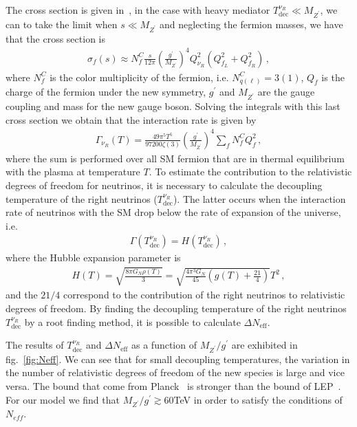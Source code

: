 \documentclass[12pt]{article}
\begin{document}
The cross section is given in~\cite{Barger:2003zh}, in the case with heavy mediator $T^{\nu_R}_{\text{dec}} \ll M_{Z^{\prime}}$, we can to take the limit when $s \ll M_{Z^{\prime}}$ and neglecting the fermion masses, we have that the cross section is
%
\begin{align*}
    \sigma_{f}(s) \approx N^{C}_{f} \frac{s}{12 \pi} \left( \frac{g^{\prime}}{M_{Z^{\prime}}} \right)^{4} Q^{2}_{\nu_R} (Q^{2}_{f_L} + Q^{2}_{f_R})\,,
\end{align*}
%
where $N^{C}_{f}$ is the color multiplicity of the fermion, i.e. $N^{C}_{q(\ell)} = 3(1)$, $Q_{f}$ is the charge of the fermion under the new symmetry, $g^{\prime}$ and $M_{Z^{\prime}}$ are the gauge coupling and mass for the new gauge boson. Solving the integrals with this last cross section we obtain that the interaction rate is given by
%
\begin{align*}
    \Gamma_{\nu_{R}}(T) = \frac{49 \pi^{5} T^{5}}{97200 \zeta(3)} \left( \frac{g^{\prime}}{M_{Z^{\prime}}} \right)^{4} \sum_{f} N^{C}_{f} Q^{2}_{f}\,,
\end{align*}
%
where the sum is performed over all SM fermion that are in thermal equilibrium with the plasma at temperature $T$. To estimate the contribution to the relativistic degrees of freedom for neutrinos, it is necessary to calculate the decoupling temperature of the right neutrinos ($T^{\nu_R}_{\text{dec}}$). The latter occurs when the interaction rate of neutrinos with the SM drop below the rate of expansion of the universe, i.e.
%
\begin{align*}
\Gamma(T^{\nu_R}_{\text{dec}}) = H(T^{\nu_R}_{\text{dec}})\,, 
\end{align*}
%
where the Hubble expansion parameter is
%
\begin{align*}
    H(T) = \sqrt{\frac{8 \pi G_{N} \rho(T)}{3}} = \sqrt{\frac{4 \pi^{3} G_{N}}{45} \left( g(T) + \frac{21}{4} \right)} T^{2}\,,
\end{align*}
%
and the $21/4$ correspond to the contribution of the right neutrinos to relativistic degrees of freedom. By finding the decoupling temperature of the right neutrinos $T^{\nu_R}_{\text{dec}} $ by a root finding method, it is possible to calculate $\Delta N_{\text{eff}}$.

The results of $T^{\nu_R}_{\text{dec}}$ and $\Delta N_{\text{eff}}$ as a function of $M_{Z^{\prime}}/g^{\prime}$ are exhibited in fig.~\ref{fig:Neff}. We can see that for small decoupling temperatures, the variation in the number of relativistic degrees of freedom of the new species is large and vice versa. The bound that come from Planck~\cite{ghanim:2018eyx} is stronger than the bound of LEP~\cite{Alioli:2017nzr}. For our model we find that $M_{Z^{\prime}}/g^{\prime} \gtrsim 60$TeV in order to satisfy the conditions of $N_{eff}$.
\end{document}
